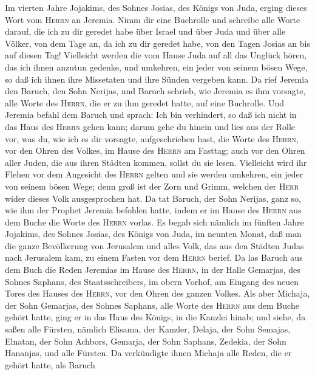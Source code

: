  Im vierten Jahre Jojakims, des Sohnes Josias, des Königs
von Juda, erging dieses Wort vom \textsc{Herrn} an Jeremia.
 Nimm dir eine Buchrolle und schreibe alle Worte darauf,
die ich zu dir geredet habe über Israel und über Juda und über alle
Völker, von dem Tage an, da ich zu dir geredet habe, von den Tagen
Josias an bis auf diesen Tag!  Vielleicht werden die vom
Hause Juda auf all das Unglück hören, das ich ihnen anzutun gedenke, und
umkehren, ein jeder von seinem bösen Wege, so daß ich ihnen ihre
Missetaten und ihre Sünden vergeben kann.  Da rief Jeremia
den Baruch, den Sohn Nerijas, und Baruch schrieb, wie Jeremia es ihm
vorsagte, alle Worte des \textsc{Herrn}, die er zu ihm geredet hatte,
auf eine Buchrolle.  Und Jeremia befahl dem Baruch und
sprach: Ich bin verhindert, so daß ich nicht in das Haus des
\textsc{Herrn} gehen kann;  darum gehe du hinein und lies
aus der Rolle vor, was du, wie ich es dir vorsagte, aufgeschrieben hast,
die Worte des \textsc{Herrn}, vor den Ohren des Volkes, im Hause des
\textsc{Herrn} am Fasttag; auch vor den Ohren aller Juden, die aus ihren
Städten kommen, sollst du sie lesen.  Vielleicht wird ihr
Flehen vor dem Angesicht des \textsc{Herrn} gelten und sie werden
umkehren, ein jeder von seinem bösen Wege; denn groß ist der Zorn und
Grimm, welchen der \textsc{Herr} wider dieses Volk ausgesprochen hat.
 Da tat Baruch, der Sohn Nerijas, ganz so, wie ihm der
Prophet Jeremia befohlen hatte, indem er im Hause des \textsc{Herrn} aus
dem Buche die Worte des \textsc{Herrn} vorlas.  Es begab
sich nämlich im fünften Jahre Jojakims, des Sohnes Josias, des Königs
von Juda, im neunten Monat, daß man die ganze Bevölkerung von Jerusalem
und alles Volk, das aus den Städten Judas nach Jerusalem kam, zu einem
Fasten vor dem \textsc{Herrn} berief.  Da las Baruch aus
dem Buch die Reden Jeremias im Hause des \textsc{Herrn}, in der Halle
Gemarjas, des Sohnes Saphans, des Staatsschreibers, im obern Vorhof, am
Eingang des neuen Tores des Hauses des \textsc{Herrn}, vor den Ohren des
ganzen Volkes.  Als aber Michaja, der Sohn Gemarjas, des
Sohnes Saphans, alle Worte des \textsc{Herrn} aus dem Buche gehört
hatte,  ging er in das Haus des Königs, in die Kanzlei
hinab; und siehe, da saßen alle Fürsten, nämlich Elisama, der Kanzler,
Delaja, der Sohn Semajas, Elnatan, der Sohn Achbors, Gemarja, der Sohn
Saphans, Zedekia, der Sohn Hananjas, und alle Fürsten. 
Da verkündigte ihnen Michaja alle Reden, die er gehört hatte, als Baruch
